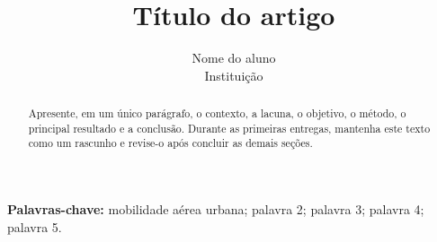 \documentclass[12pt,a4paper]{article}
\title{Título do artigo}
\author{Nome do aluno\\Instituição}
\date{}
\begin{document}
\maketitle

\begin{abstract}
Apresente, em um único parágrafo, o contexto, a lacuna, o objetivo, o método,
o principal resultado e a conclusão. Durante as primeiras entregas, mantenha
este texto como um rascunho e revise-o após concluir as demais seções.
\end{abstract}

\noindent\textbf{Palavras-chave:} mobilidade aérea urbana; palavra 2;
palavra 3; palavra 4; palavra 5.









\end{document}
